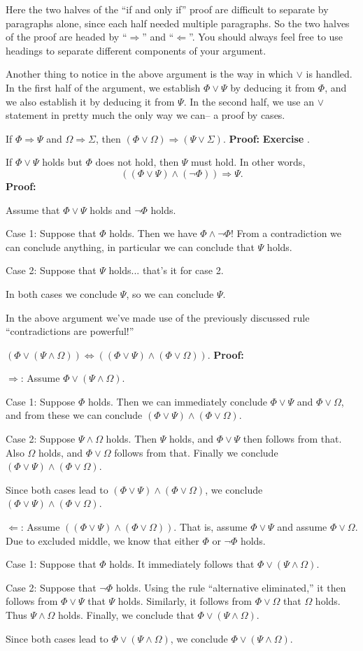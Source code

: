 \documentclass[12pt]{article}
\newcommand{\AND}{\wedge}
\newcommand{\OR}{\vee}
\newcommand{\ARR}{\Rightarrow}
\newcommand{\DARR}{\Leftrightarrow}
\newcounter{exercise}
\newcounter{rule}
\def\putExerciseHeading{\refstepcounter{exercise} \textbf{Exercise \theexercise}}
\def\putRuleNumber{\refstepcounter{rule}\therule}
\newcommand{\DRULEPF}[3]{\begin{tcolorbox}[title=Derived Rule \putRuleNumber: #1,colbacktitle=white,coltitle=black,colback=white] {#2} \tcblower \textbf{Proof:} {#3} \end{tcolorbox}}
\newcommand{\DRULEPZ}[2]{\begin{tcolorbox}[title=Derived Rule \putRuleNumber: #1,colbacktitle=white,coltitle=black,colback=white] {#2} \tcblower \textbf{Proof:} 
                         \putExerciseHeading. \end{tcolorbox}}
\def\pA{\Phi}
\def\pB{\Psi}
\def\pC{\Omega}
\def\pD{\Sigma}
\begin{document}
Here the two halves of the ``if and only if'' proof are difficult to separate by paragraphs alone, since each half needed multiple paragraphs.
So the two halves of the proof are headed by ``$\Rightarrow$'' and ``$\Leftarrow$''.
You should always feel free to use headings to separate different components of your argument.

Another thing to notice in the above argument is the way in which $\OR$ is handled.
In the first half of the argument, we establish $\pA\OR\pB$ by deducing it from $\pA$, and we also establish it by deducing it from $\pB$.
In the second half, we use an $\OR$ statement in pretty much the only way we can-- a proof by cases.

\DRULEPZ{}{If $\pA\ARR\pB$ and $\pC\ARR\pD$, then $(\pA\OR\pC)\ARR(\pB\OR\pD)$.}

\DRULEPF{Alternative Eliminated}{
If $\pA\OR\pB$ holds but $\pA$ does not hold, then $\pB$ must hold.
In other words,
$$((\pA\OR\pB)\AND(\neg\pA))\ARR\pB.$$
}{
Assume that $\pA\OR\pB$ holds and $\neg\pA$ holds.
\lsp

Case 1: Suppose that $\pA$ holds.
Then we have $\pA\AND\neg\pA$! From a contradiction we can conclude anything, in particular we can conclude that $\pB$ holds.
\lsp

Case 2: Suppose that $\pB$ holds... that's it for case 2.
\lsp

In both cases we conclude $\pB$, so we can conclude $\pB$.
}

In the above argument we've made use of the previously discussed rule ``contradictions are powerful!''


\DRULEPF{Or Distributes over And}{
$(\pA\OR(\pB\AND\pC))\DARR((\pA\OR\pB)\AND(\pA\OR\pC))$.
}{
$\Rightarrow$:
Assume $\pA\OR(\pB\AND\pC)$.
\lsp

Case 1: Suppose $\pA$ holds. Then we can immediately conclude $\pA\OR\pB$ and $\pA\OR\pC$, and from these
we can conclude $(\pA\OR\pB)\AND(\pA\OR\pC)$.
\lsp

Case 2: Suppose $\pB\AND\pC$ holds.
Then $\pB$ holds, and $\pA\OR\pB$ then follows from that.
Also $\pC$ holds, and $\pA\OR\pC$ follows from that.
Finally we conclude $(\pA\OR\pB)\AND(\pA\OR\pC)$.
\lsp

Since both cases lead to $(\pA\OR\pB)\AND(\pA\OR\pC)$, we conclude $(\pA\OR\pB)\AND(\pA\OR\pC)$.
\lsp

$\Leftarrow$: Assume $((\pA\OR\pB)\AND(\pA\OR\pC))$.
That is, assume $\pA\OR\pB$ and assume $\pA\OR\pC$.
Due to excluded middle, we know that either $\pA$ or $\neg\pA$ holds.
\lsp

Case 1: Suppose that $\pA$ holds. It immediately follows that $\pA\OR(\pB\AND\pC)$.
\lsp

Case 2: Suppose that $\neg\pA$ holds. Using the rule ``alternative eliminated,''
it then follows from $\pA\OR\pB$ that $\pB$ holds.
Similarly, it follows from $\pA\OR\pC$ that $\pC$ holds. Thus $\pB\AND\pC$ holds.
Finally, we conclude that $\pA\OR(\pB\AND\pC)$.
\lsp

Since both cases lead to $\pA\OR(\pB\AND\pC)$, we conclude $\pA\OR(\pB\AND\pC)$.
}
\end{document}
